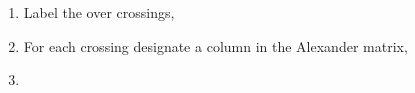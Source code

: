 \begin{enumerate}
\item Label the over crossings,
\item For each crossing designate a column in the Alexander matrix,
\item 
\end{enumerate}

%
%
%
